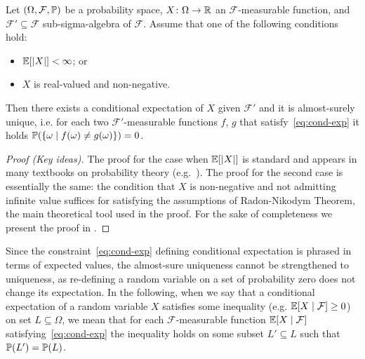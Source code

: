 \begin{proposition}
\label{prop:conditional-exp-existence}
\label{PROP:CONDITIONAL-EXP-EXISTENCE}
Let $(\Omega,\mathcal{F},\mathbb{P})$ be a probability space, 
$X\colon\Omega\rightarrow 
\mathbb{R}$ an $\mathcal{F}$-measurable function, and $\mathcal{F}'\subseteq 
\mathcal{F}$ sub-sigma-algebra of $\mathcal{F}$. Assume that one of the following conditions hold:
\begin{itemize}
\item $\mathbb{E}[|X|]<\infty$; or
\item $X$ is real-valued and non-negative.
\end{itemize}
Then there exists a conditional expectation of $X$ given $\mathcal{F}'$ and it is almost-surely unique, i.e. for each two $\mathcal{F}'$-measurable functions $f$, $g$ that satisfy~\eqref{eq:cond-exp} it holds $\mathbb{P}(\{\omega\mid f(\omega)\neq g(\omega)\})=0$.
\end{proposition}
\begin{proof}[Proof (Key ideas)]
The proof for the case when $\mathbb{E}[|X|]$ is standard and appears in many textbooks on probability theory (e.g.~\cite{Billingsley:book,Ash:book,Rosenthal:book}). The proof for the second case is essentially the same: the condition that $X$ is non-negative and not admitting infinite value suffices for satisfying the assumptions of Radon-Nikodym Theorem, the main theoretical tool used in the proof. For the sake of completeness we present the proof in \AppendixMaterial.
\end{proof}

Since the constraint~\eqref{eq:cond-exp} defining conditional expectation is 
phrased in terms of expected values, the almost-sure uniqueness cannot be 
strengthened to uniqueness, as re-defining a random variable on a set of 
probability zero does not change its expectation. In the following, when we say 
that a conditional expectation of a random variable $X$ satisfies some 
inequality (e.g. $\mathbb{E}[X\mid\mathcal{F}]\geq 0$) on set $L\subseteq \Omega$, we 
mean that for each $\mathcal{F}$-measurable function $\mathbb{E}[X\mid\mathcal{F}]$ 
satisfying~\eqref{eq:cond-exp} the inequality holds on some subset $L'\subseteq 
L$ such that $\mathbb{P}(L')=\mathbb{P}(L)$.

